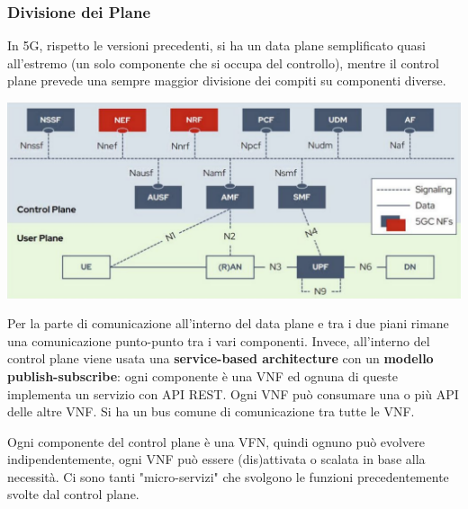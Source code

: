 \subsubsection{Divisione dei Plane}
In 5G, rispetto le versioni precedenti, si ha un data plane semplificato quasi all'estremo (un solo componente che si occupa del controllo), mentre il control plane prevede una sempre maggior divisione dei compiti su componenti diverse.
\begin{center}
	\includegraphics[width=0.9\linewidth]{img/5g/arch}
\end{center}

Per la parte di comunicazione all'interno del data plane e tra i due piani rimane una comunicazione punto-punto tra i vari componenti. Invece, all'interno del control plane viene usata una \textbf{service-based architecture} con un \textbf{modello publish-subscribe}: ogni componente è una VNF ed ognuna di queste implementa un servizio con API REST. Ogni VNF può consumare una o più API delle altre VNF. Si ha un bus comune di comunicazione tra tutte le VNF.

Ogni componente del control plane è una VFN, quindi ognuno può evolvere indipendentemente, ogni VNF può essere (dis)attivata o scalata in base alla necessità. Ci sono tanti "micro-servizi" che svolgono le funzioni precedentemente svolte dal control plane.

